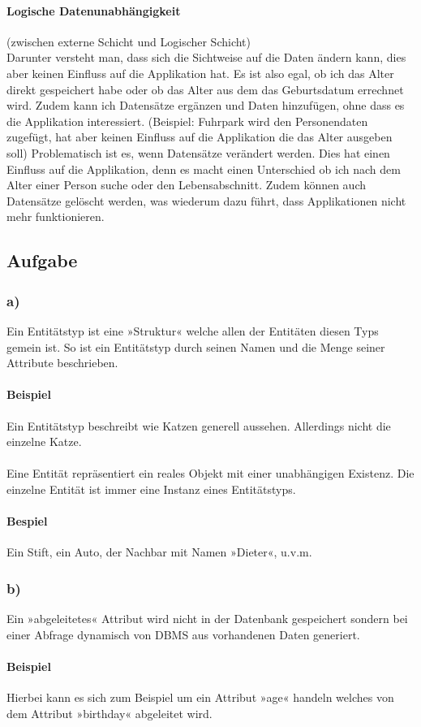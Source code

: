 \documentclass[11pt,a4paper,DIV=9]{scrartcl}
\newcounter{temp}
\newcommand{\aufgabe}[1]{
  \setcounter{temp}{\value{subsection}}
  \setcounter{subsection}{#1}
  \addtocounter{subsection}{-1}
  \subsection{Aufgabe}
  \setcounter{subsection}{\value{temp}}
}
\newcommand{\teil}[2][]{
  \subsubsection*{#2) #1}
}
\begin{document}
  \paragraph{Logische Datenunabhängigkeit} %
  \label{par:logische_datenunabh_ngigkeit}
  (zwischen externe Schicht und Logischer Schicht) \\

  Darunter versteht man, dass sich die Sichtweise auf die Daten ändern kann, dies aber keinen Einfluss auf die Applikation hat. Es ist also egal, ob ich das Alter direkt gespeichert habe oder ob das Alter aus dem das Geburtsdatum errechnet wird. Zudem kann ich Datensätze ergänzen und Daten hinzufügen, ohne dass es die Applikation interessiert. (Beispiel: Fuhrpark wird den Personendaten zugefügt, hat aber keinen Einfluss auf die Applikation die das Alter ausgeben soll) Problematisch ist es, wenn Datensätze verändert werden. Dies hat einen Einfluss auf die Applikation, denn es macht einen Unterschied ob ich nach dem Alter einer Person suche oder den Lebensabschnitt. Zudem können auch Datensätze gelöscht werden, was wiederum dazu führt, dass Applikationen nicht mehr funktionieren.


\aufgabe{2}
\teil{a}
  Ein Entitätstyp ist eine »Struktur« welche allen der Entitäten diesen Typs gemein ist. So ist ein Entitätstyp durch seinen Namen und die Menge seiner Attribute beschrieben.
  \paragraph{Beispiel} Ein Entitätstyp beschreibt wie Katzen generell aussehen. Allerdings nicht die einzelne Katze.
  \paragraph{} Eine Entität repräsentiert ein reales Objekt mit einer unabhängigen Existenz. Die einzelne Entität ist immer eine Instanz eines Entitätstyps.
  \paragraph{Bespiel} Ein Stift, ein Auto, der Nachbar mit Namen »Dieter«, u.v.m.

\teil{b}
  Ein »abgeleitetes« Attribut wird nicht in der Datenbank gespeichert sondern bei einer Abfrage dynamisch von DBMS aus vorhandenen Daten generiert.
  \paragraph{Beispiel} Hierbei kann es sich zum Beispiel um ein Attribut »age« handeln welches von dem Attribut »birthday« abgeleitet wird.
\end{document}
